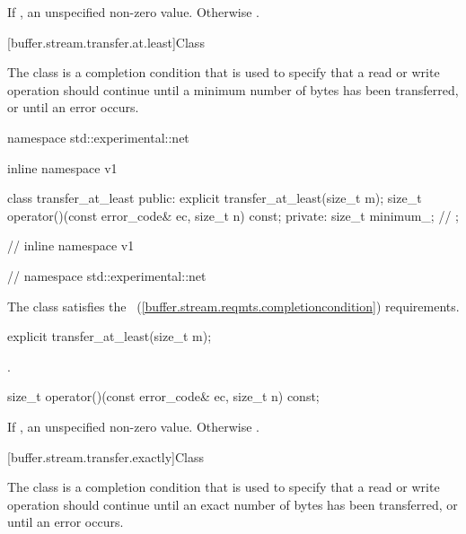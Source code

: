 \begin{itemdescr}
\pnum
\returns If , an unspecified non-zero value. Otherwise .
\end{itemdescr}



[buffer.stream.transfer.at.least]{Class }

%
\pnum
The class  is a completion condition that is used to specify that a read or write operation should continue until a minimum number of bytes has been transferred, or until an error occurs.

\begin{codeblock}
namespace std::experimental::net {
inline namespace v1 {

  class transfer_at_least
  {
  public:
    explicit transfer_at_least(size_t m);
    size_t operator()(const error_code& ec, size_t n) const;
  private:
    size_t minimum_; // \expos
  };

} // inline namespace v1
} // namespace std::experimental::net
\end{codeblock}

\pnum
The class  satisfies the ~(\ref{buffer.stream.reqmts.completioncondition}) requirements.

\begin{itemdecl}
explicit transfer_at_least(size_t m);
\end{itemdecl}

\begin{itemdescr}
\pnum
\postconditions {}.
\end{itemdescr}

\begin{itemdecl}
size_t operator()(const error_code& ec, size_t n) const;
\end{itemdecl}

\begin{itemdescr}
\pnum
\returns If , an unspecified non-zero value. Otherwise .
\end{itemdescr}



[buffer.stream.transfer.exactly]{Class }

%
\pnum
The class  is a completion condition that is used to specify that a read or write operation should continue until an exact number of bytes has been transferred, or until an error occurs.

